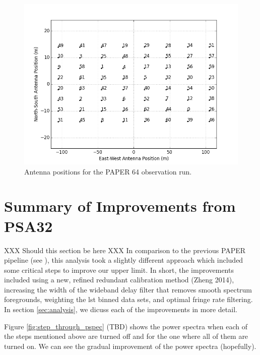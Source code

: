 \documentclass[twocolumn,numberedappendix]{emulateapj}
\begin{document}
\begin{figure}[!t]\centering
\includegraphics[width=1.85\columnwidth,height=\columnwidth]{plots/antenna_positions.png}
\caption{Antenna positions for the PAPER 64 observation run.}
\label{fig:antenna_positions}
\end{figure}

\section{Summary of Improvements from PSA32}
XXX Should this section be here XXX
In comparison to the previous PAPER pipeline (see \cite{parsons_et_al2014a}),
this analysis took a slightly different approach which included some critical
steps to improve our upper limit. In short, the improvements included using a
new, refined redundant calibration method (Zheng 2014), increasing the width of
the wideband delay filter that removes smooth spectrum foregrounds, weighting
the lst binned data sets, and optimal fringe rate filtering. In section
\ref{sec:analysis}, we dicuss each of the improvements in more detail.

Figure \ref{fig:step_through_pspec} (TBD) shows the power spectra when each of
the steps mentioned above are turned off and for the one where all of them are
turned on. We can see the gradual improvement of the power spectra (hopefully).
\end{document}
